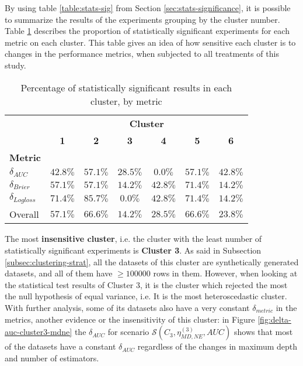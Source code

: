 By using table \ref{table:stats-sig} from Section \ref{sec:stats-significance}, it is possible to summarize the results of the experiments grouping by the cluster number. Table \ref{table:stats-clusters} describes the proportion of statistically significant experiments for each metric on each cluster. This table gives an idea of how sensitive each cluster is to changes in the performance metrics, when subjected to all treatments of this study.

\begin{table}[H]
    \centering
    \begin{tabular}{l|cccccc}
              & \multicolumn{6}{c}{\textbf{\large Cluster}}                                    \\
              & \textbf{1} & \textbf{2} & \textbf{3} & \textbf{4} & \textbf{5} & \textbf{6}    \\
    \textbf{\large Metric} &          &          &          &          &          &          \\
    \midrule
    $\delta_{AUC}$         & $42.8\%$ & $57.1\%$ & $28.5\%$ & $0.0\%$  & $57.1\%$ & $42.8\%$ \\
    $\delta_{Brier}$       & $57.1\%$ & $57.1\%$ & $14.2\%$ & $42.8\%$ & $71.4\%$ & $14.2\%$ \\
    $\delta_{Logloss}$     & $71.4\%$ & $85.7\%$ & $0.0\%$  & $42.8\%$ & $71.4\%$ & $14.2\%$ \\
    \midrule
                   Overall & $57.1\%$ & $66.6\%$ & $14.2\%$ & $28.5\%$ & $66.6\%$ & $23.8\%$ 
    \end{tabular}
    \caption{Percentage of statistically significant results in each cluster, by metric}
    \label{table:stats-clusters}
\end{table}

The most \textbf{insensitive cluster}, i.e. the cluster with the least number of statistically significant experiments is \textbf{Cluster 3}. As said in Subsection \ref{subsec:clustering-strat}, all the datasets of this cluster are synthetically generated datasets, and all of them have $\geq 100000$ rows in them.  However, when looking at the statistical test results of Cluster 3, it is  the cluster which rejected the most the null hypothesis of equal variance, i.e. It is the most heteroscedastic cluster. With further analysis, some of its datasets also have a very constant $\delta_{metric}$ in the metrics, another evidence or the insensitivity of this cluster: in Figure \ref{fig:delta-auc-cluster3-mdne} the $\delta_{AUC}$ for scenario $\mathcal{S}(C_3, \eta^{(3)}_{MD, NE}, AUC)$ shows that most of the datasets have a constant $\delta_{AUC}$ regardless of the changes in maximum depth and number of estimators.

